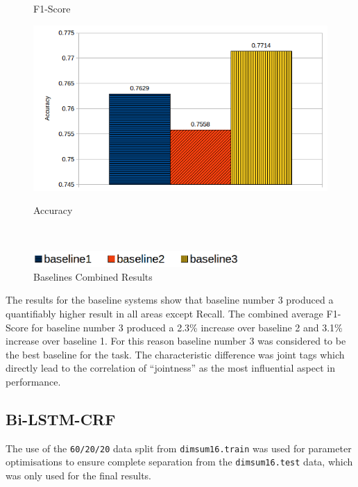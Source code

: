 \begin{figure}[H]
\begin{minipage}{.5\textwidth}
    \centerline{F1-Score}\medskip
  \end{minipage}\hfill
  \begin{minipage}{.5\textwidth}
    \includegraphics[width=\textwidth]{images/baselines_combined_accuracy.png}
    \centerline{Accuracy}\medskip
  \end{minipage}\\
  \begin{minipage}{\textwidth}
    \centerline{\includegraphics[width=0.7\textwidth]{images/baselines_combined_legend.png}}
  \end{minipage}
  \caption{Baselines Combined Results}
  \label{fig:baselinescombinedresults}
\end{figure}

The results for the baseline systems show that baseline number 3 produced a quantifiably higher result in all areas except Recall. The combined average F1-Score for baseline number 3 produced a 2.3\% increase over baseline 2 and 3.1\% increase over baseline 1. For this reason baseline number 3 was considered to be the best baseline for the \dimsum task. The characteristic difference was joint tags which directly lead to the correlation of ``jointness'' as the most influential aspect in performance.

\subsection{Bi-LSTM-CRF}
The use of the \texttt{60/20/20} data split from \texttt{dimsum16.train} was used for parameter optimisations to ensure complete separation from the \texttt{dimsum16.test} data, which was only used for the final results. 

